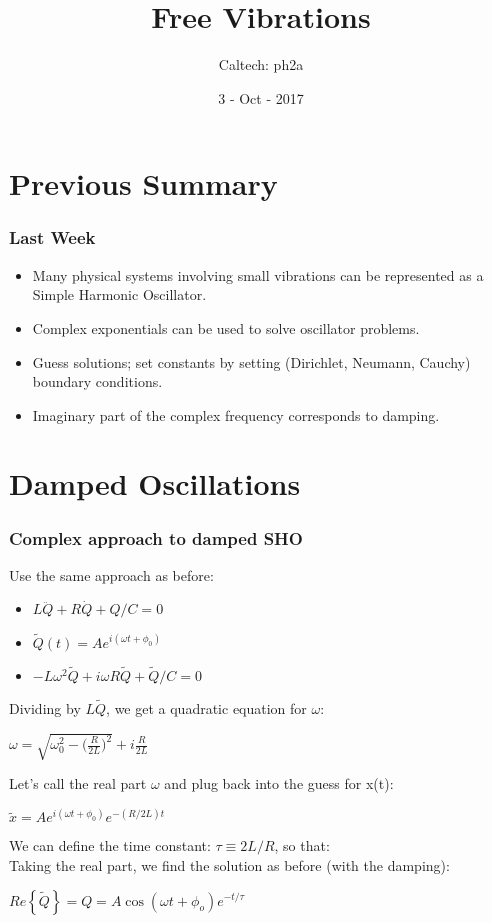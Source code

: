 \documentclass[pdf,hideothersubsections]{beamer}
\begin{document}
\title{Free Vibrations}  
\author{Caltech: ph2a}
\date{3 - Oct - 2017}

\frame{\titlepage} 


\section{Previous Summary}
\begin{frame}
\frametitle{Last Week}
\begin{itemize}
\item Many physical systems involving small vibrations can be represented as a Simple Harmonic Oscillator.

\item Complex exponentials can be used to solve oscillator problems.

\item Guess solutions; set constants by setting (Dirichlet, Neumann, Cauchy) boundary conditions.

\item Imaginary part of the complex frequency corresponds to damping.
\end{itemize}
\end{frame}


\section{Damped Oscillations}
\begin{frame}
\frametitle{Complex approach to damped SHO}
Use the same approach as before:
\begin{itemize}
\item $L \ddot{Q} + R \dot{Q} + Q/C = 0$
\pause
\item $\tilde{Q}(t) = A e^{i (\omega t + \phi_0)}$
\pause
\item $-L \omega^2 \tilde{Q} + i \omega R \tilde{Q} + \tilde{Q}/C = 0$
\end{itemize}
\pause
Dividing by $L \tilde{Q}$, we get a quadratic equation for $\omega$: \\
\pause
\begin{center}
$\omega = \sqrt{\omega_0^2 - \Big(\frac{R}{2 L}\Big)^2} + i \frac{R}{2 L}$ \\
\end{center}
\pause
Let's call the real part $\omega$ and plug back into the guess for x(t):
\pause
\begin{center}
$\tilde{x} = A e^{i (\omega t + \phi_0)} e^{-(R/2 L) t}$\\
\end{center}
\pause
We can define the time constant: $\tau \equiv 2 L/R$, so that: \\
\pause
Taking the real part, we find the solution as before (with the damping): \\
\pause
\begin{center}
$Re\left\{\tilde{Q}\right\} = Q = A \cos(\omega t + \phi_o) e^{-t/\tau}$
\end{center}

\end{frame}
\end{document}
